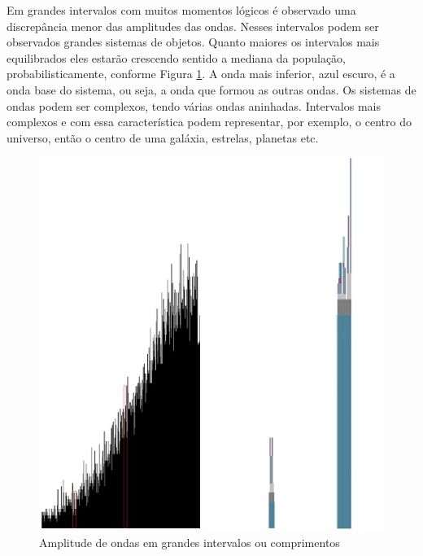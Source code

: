 Em grandes intervalos com muitos momentos lógicos é observado uma discrepância menor das amplitudes das ondas. Nesses intervalos podem ser observados grandes sistemas de objetos. Quanto maiores os intervalos mais equilibrados eles estarão crescendo sentido a mediana da população, probabilisticamente, conforme Figura \ref{fig:consciousness_space_subconsciousness}. A onda mais inferior, azul escuro, é a onda base do sistema, ou seja, a onda que formou as outras ondas. Os sistemas de ondas podem ser complexos, tendo várias ondas aninhadas. Intervalos mais complexos e com essa característica podem representar, por exemplo, o centro do universo, então o centro de uma galáxia, estrelas, planetas etc.
	\begin{figure}[H]
	\caption{Amplitude de ondas em grandes intervalos ou comprimentos}
	\label{fig:consciousness_space_subconsciousness}
	\centering
	\includegraphics[scale=.45]{sections/images/consciousness_space_subconsciousness.jpg}
	\end{figure}

